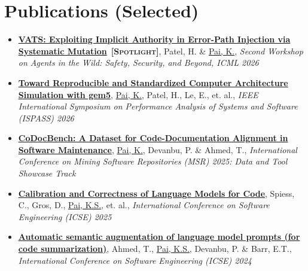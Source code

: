\documentclass[letterpaper,10pt]{article}
\newcommand{\resumeItem}[1]{\item\small{#1} \vspace{-3pt}}
\begin{document}
\section{Publications (Selected)}
{\normalsize
\begin{itemize}[leftmargin=0.15in, label={}, itemsep=0pt]
  \resumeItem{\href{https://arxiv.org/pdf/2606.07992}{\textbf{VATS: Exploiting Implicit Authority in Error-Path Injection via Systematic Mutation}} \,\textbf{\textsc{[Spotlight]}}, Patel, H. \& \underline{Pai, K.}, \textit{Second Workshop on Agents in the Wild: Safety, Security, and Beyond, ICML 2026}}
  \resumeItem{\href{https://doi.org/10.1109/ISPASS69572.2026.00027}{\textbf{Toward Reproducible and Standardized Computer Architecture Simulation with gem5}}, \underline{Pai, K.}, Patel, H., Le, E., et. al., \textit{IEEE International Symposium on Performance Analysis of Systems and Software (ISPASS) 2026}}
  \resumeItem{\href{https://doi.org/10.1109/MSR66628.2025.00077}{\textbf{CoDocBench: A Dataset for Code-Documentation Alignment in Software Maintenance}}, \underline{Pai, K.}, Devanbu, P. \& Ahmed, T., \textit{International Conference on Mining Software Repositories (MSR) 2025: Data and Tool Showcase Track}}
  \resumeItem{\href{https://doi.org/10.1109/ICSE55347.2025.00040}{\textbf{Calibration and Correctness of Language Models for Code}}, Spiess, C., Gros, D., \underline{Pai, K.S.}, et. al., \textit{International Conference on Software Engineering (ICSE) 2025}}
  \resumeItem{\href{https://dl.acm.org/doi/pdf/10.1145/3597503.3639183}{\textbf{Automatic semantic augmentation of language model prompts (for code summarization)}}, Ahmed, T., \underline{Pai, K.S.}, Devanbu, P. \& Barr, E.T., \textit{International Conference on Software Engineering (ICSE) 2024}}
\end{itemize}
}
\end{document}
